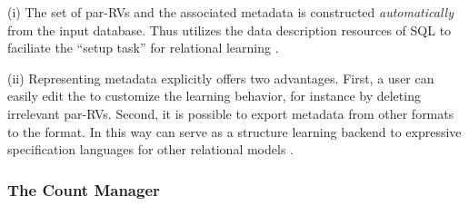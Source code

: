 \documentclass[letterpaper]{article}
\begin{document}
(i) The set of par-RVs and the associated metadata is constructed {\em automatically} from the input database. 
Thus \FB utilizes the data description resources of SQL to faciliate the ``setup task'' for relational learning \cite{Walker2010}.

(ii) 
Representing metadata explicitly offers two advantages. 
First, a user can easily edit the \RVD to customize the learning behavior, for instance by deleting irrelevant par-RVs. Second, it is possible to export metadata from other formats to the \RVD format.
In this way \FB can serve as a structure learning backend to expressive specification languages for other relational models \cite{Guazzelli2009,Milch2005}.


%
%
%




\subsubsection{The Count Manager}
\end{document}
